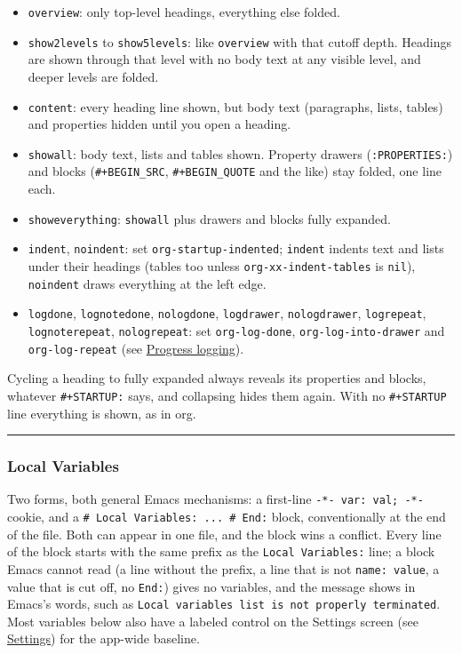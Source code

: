 \documentclass[11pt]{article}
\begin{document}
\begin{itemize}
\item \texttt{overview}: only top-level headings, everything else folded.
\item \texttt{show2levels} to \texttt{show5levels}: like \texttt{overview} with that cutoff depth. Headings are shown through that level with no body text at any visible level, and deeper levels are folded.
\item \texttt{content}: every heading line shown, but body text (paragraphs, lists, tables) and properties hidden until you open a heading.
\item \texttt{showall}: body text, lists and tables shown. Property drawers (\texttt{:PROPERTIES:}) and blocks (\texttt{\#+BEGIN\_SRC}, \texttt{\#+BEGIN\_QUOTE} and the like) stay folded, one line each.
\item \texttt{showeverything}: \texttt{showall} plus drawers and blocks fully expanded.
\item \texttt{indent}, \texttt{noindent}: set \texttt{org-startup-indented}; \texttt{indent} indents text and lists under their headings (tables too unless \texttt{org-xx-indent-tables} is \texttt{nil}), \texttt{noindent} draws everything at the left edge.
\item \texttt{logdone}, \texttt{lognotedone}, \texttt{nologdone}, \texttt{logdrawer}, \texttt{nologdrawer}, \texttt{logrepeat}, \texttt{lognoterepeat}, \texttt{nologrepeat}: set \texttt{org-log-done}, \texttt{org-log-into-drawer} and \texttt{org-log-repeat} (see \hyperref[sec:orgfbb8a58]{Progress logging}).
\end{itemize}

Cycling a heading to fully expanded always reveals its properties and blocks, whatever \texttt{\#+STARTUP:} says, and collapsing hides them again. With no \texttt{\#+STARTUP} line everything is shown, as in org.

\noindent\rule{\textwidth}{0.5pt}

\subsubsection{Local Variables}
\label{sec:org761a631}
Two forms, both general Emacs mechanisms: a first-line \texttt{-*- var: val; -*-} cookie, and a \texttt{\# Local Variables: ... \# End:} block, conventionally at the end of the file. Both can appear in one file, and the block wins a conflict. Every line of the block starts with the same prefix as the \texttt{Local Variables:} line; a block Emacs cannot read (a line without the prefix, a line that is not \texttt{name: value}, a value that is cut off, no \texttt{End:}) gives no variables, and the message shows in Emacs's words, such as \texttt{Local variables list is not properly terminated}. Most variables below also have a labeled control on the Settings screen (see \hyperref[sec:org788d206]{Settings}) for the app-wide baseline.
\end{document}
